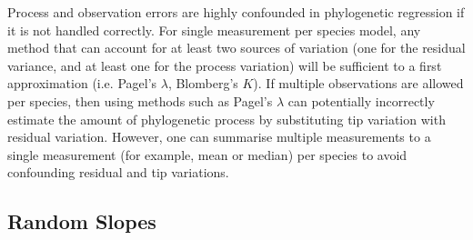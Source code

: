 \documentclass[12pt]{article}
\begin{document}
Process and observation errors are highly confounded in phylogenetic regression if it is not handled correctly. 
For single measurement per species model, any method that can account for at least two sources of variation (one for the residual variance, and at least one for the process variation) will be sufficient to a first approximation (i.e. Pagel's $\lambda$, Blomberg's $K$).
If multiple observations are allowed per species, then using methods such as Pagel's $\lambda$ can potentially incorrectly estimate the amount of phylogenetic process by substituting tip variation with residual variation. 
However, one can summarise multiple measurements to a single measurement (for example, mean or median) per species to avoid confounding residual and tip variations.

\subsection{Random Slopes}
\end{document}
